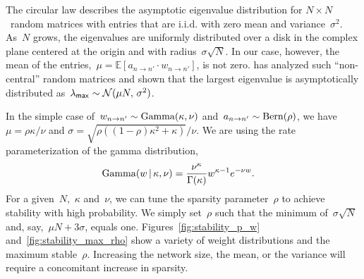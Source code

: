 The circular law describes the asymptotic eigenvalue distribution for
$N \times N$~random matrices with entries that are i.i.d. with zero
mean and variance~$\sigma^2$. As~$N$ grows, the eigenvalues are
uniformly distributed over a disk in the complex plane centered at the
origin and with radius~$\sigma\sqrt{N}$. In our case, however, the
mean of the entries,~${\mu=\mathbb{E}[a_{n \to n'} \cdot w_{n \to
      n'}]}$, is not zero. \citet{Silverstein-1994} has analyzed such
``non-central'' random matrices and shown that the largest eigenvalue
is asymptotically distributed
as~${\lambda_{\sf{max}} \sim \mathcal{N}(\mu N,\, \sigma^2)}$.

In the simple case of~${w_{n \to n'}\sim \mathrm{Gamma}(\kappa,\nu)}$
and~${a_{n \to n'}\sim\mathrm{Bern}(\rho)}$, we have
${\mu = \rho \kappa/\nu}$ and
${\sigma=\sqrt{\rho((1-\rho)\kappa^2+\kappa)}/\nu}$. We are using the 
rate parameterization of the gamma distribution, 
\begin{align*}
\mathrm{Gamma}(w \,|\, \kappa, \nu) &= \frac{\nu^{\kappa}}{\Gamma(\kappa)}w^{\kappa- 1} e^{-\nu w}.
\end{align*}
For a
given~$N$,~$\kappa$ and~$\nu$, we can tune the sparsity
parameter~$\rho$ to achieve stability with high probability. We simply
set~$\rho$ such that the minimum of~$\sigma\sqrt{N}$ and,
say,~${\mu N + 3\sigma}$, equals one. Figures~\ref{fig:stability_p_w}
and~\ref{fig:stability_max_rho} show a variety of weight distributions
and the maximum stable~$\rho$. Increasing the network size, the mean,
or the variance will require a concomitant increase in sparsity.

